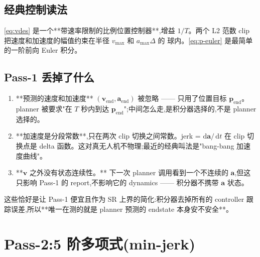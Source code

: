 \documentclass[UTF8, 11pt]{ctexart}
\newcommand{\dt}{\,\mathrm{d}t}
\begin{document}
\subsection{经典控制读法}

\eqref{eq:vdes} 是一个**带速率限制的比例位置控制器**,增益 $1/T$。两个 L2
范数 clip 把速度和加速度的幅值约束在半径 $v_{\max}$ 和 $a_{\max}\Delta$ 的
球内。\eqref{eq:p-euler} 是最简单的一阶前向 Euler 积分。

\subsection{Pass-1 丢掉了什么}

\begin{enumerate}
  \item **预测的速度和加速度** $(\bm{v}_{\text{end}}, \bm{a}_{\text{end}})$ 被忽略 —— 只用了位置目标 $\bm{p}_{\text{end}}$。planner 被要求"在 $T$ 秒内到达 $\bm{p}_{\text{end}}$";中间怎么走,是积分器选择的,不是 planner 选择的。
  \item **加速度是分段常数**,只在两次 clip 切换之间常数。jerk = $\mathrm{d}\bm{a}/\dt$ 在 clip 切换点是 delta 函数。这对真无人机不物理;最近的经典叫法是"bang-bang 加速度曲线"。
  \item **$\bm{v}$ 之外没有状态连续性。** 下一次 planner 调用看到一个不连续的 $\bm{a}$,但这只影响 Pass-1 的 report,不影响它的 dynamics —— 积分器不携带 $\bm{a}$ 状态。
\end{enumerate}

这些恰好是让 Pass-1 便宜且作为 SR 上界的简化:积分器去掉所有的 controller
跟踪误差,所以**唯一在测的就是 planner 预测的 endstate 本身安不安全**。

\section{Pass-2:5 阶多项式(min-jerk)}
\end{document}
